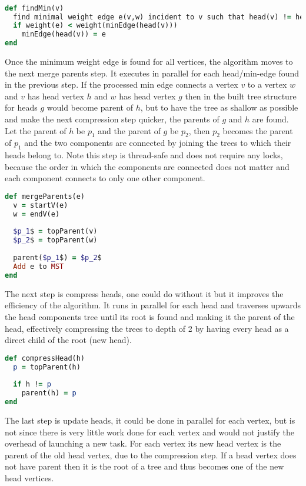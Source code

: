 \documentclass{report}
\theoremstyle{plain}
\theoremstyle{definition}
\theoremstyle{remark}
\begin{document}
\begin{lstlisting}[language=Ruby]

def findMin(v)
  find minimal weight edge e(v,w) incident to v such that head(v) != head(w)
  if weight(e) < weight(minEdge(head(v)))
    minEdge(head(v)) = e
end
\end{lstlisting}

Once the minimum weight edge is found for all vertices, the algorithm moves to the next merge parents step. It executes in parallel for each head/min-edge found in the previous step. If the processed min edge connects a vertex $v$ to a vertex $w$ and $v$ has head vertex $h$ and $w$ has head vertex $g$ then in the built tree structure for heads $g$ would become parent of $h$, but to have the tree as shallow as possible and make the next compression step quicker, the parents of $g$ and $h$ are found. Let the parent of $h$ be $p_1$ and the parent of $g$ be $p_2$, then $p_2$ becomes the parent of $p_1$ and the two components are connected by joining the trees to which their heads belong to. Note this step is thread-safe and does not require any locks, because the order in which the components are connected does not matter and each component connects to only one other component.

\begin{lstlisting}[language=Ruby, mathescape]
def mergeParents(e)
  v = startV(e)
  w = endV(e)
  
  $p_1$ = topParent(v)
  $p_2$ = topParent(w)
   
  parent($p_1$) = $p_2$
  Add e to MST 
end
\end{lstlisting}

The next step is compress heads, one could do without it but it improves the efficiency of the algorithm. It runs in parallel for each head and traverses upwards the head components tree until its root is found and making it the parent of the head, effectively compressing the trees to depth of 2 by having every head as a direct child of the root (new head).

\begin{lstlisting}[language=Ruby]
def compressHead(h)
  p = topParent(h)  
  
  if h != p
    parent(h) = p
end
\end{lstlisting}

The last step is update heads, it could be done in parallel for each vertex, but is not since there is very little work done for each vertex and would not justify the overhead of launching a new task. For each vertex its new head vertex is the parent of the old head vertex, due to the compression step. If a head vertex does not have parent then it is the root of a tree and thus becomes one of the new head vertices.
\end{document}
